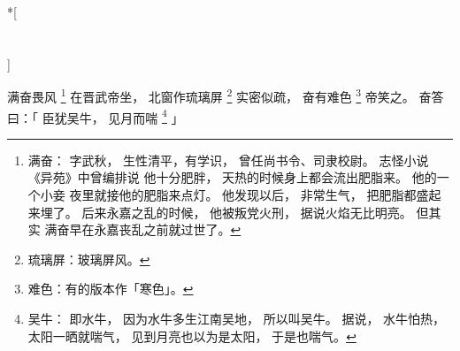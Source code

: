 
\switchcolumn[0]*[\section{}]

满奋畏风%
\footnote{%
    满奋：
        字武秋，
        生性清平，有学识，
        曾任尚书令、司隶校尉。
        志怪小说《异苑》中曾编排说
        他十分肥胖，
        天热的时候身上都会流出肥脂来。
        他的一个小妾
        夜里就接他的肥脂来点灯。
        他发现以后，
        非常生气，
        把肥脂都盛起来埋了。
        后来永嘉之乱的时候，
        他被叛党火刑，
        据说火焰无比明亮。
        但其实
        满奋早在永嘉丧乱之前就过世了。
}%
在晋武帝坐，
北窗作琉璃屏%
\footnote{%
    琉璃屏：玻璃屏风。
}%
实密似疏，
奋有难色%
\footnote{%
    难色：有的版本作「寒色」。
}%
帝笑之。
奋答曰：「
    臣犹吴牛，
    见月而喘%
    \footnote{%
        吴牛：
            即水牛，
            因为水牛多生江南吴地，
            所以叫吴牛。
            据说，
            水牛怕热，
            太阳一晒就喘气，
            见到月亮也以为是太阳，
            于是也喘气。
    }%
」

\switchcolumn



